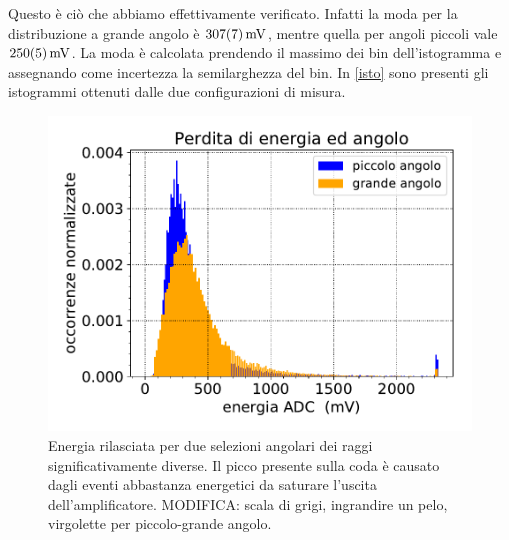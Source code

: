 Questo è ciò che abbiamo effettivamente verificato.
Infatti la moda per la distribuzione a grande angolo è $\SI{307\pm7}{mV}$,
mentre quella per angoli piccoli vale $\SI{250\pm5}{mV}$.
La moda è calcolata prendendo il massimo dei bin dell'istogramma e assegnando come incertezza la semilarghezza del bin.
In \autoref{isto} sono presenti gli istogrammi ottenuti dalle due configurazioni di misura.
\begin{figure}
\centering
\includegraphics[width=8 cm]{angoli}
\caption{Energia rilasciata per due selezioni angolari dei raggi significativamente diverse.
Il picco presente sulla coda è causato dagli eventi abbastanza energetici da saturare l'uscita dell'amplificatore.
MODIFICA: scala di grigi, ingrandire un pelo, virgolette per piccolo-grande angolo.}
\label{isto}
\end{figure}
